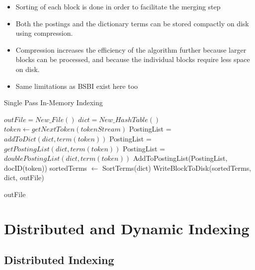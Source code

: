 \documentclass{article}
\begin{document}
\begin{itemize}
    \item Sorting of each block is done in order to facilitate the merging step
    
    \item Both the postings and the dictionary terms can be stored compactly on disk using compression.
    
    \item Compression increases the efficiency of the algorithm further because larger blocks can be processed, and because the individual blocks require less space on disk. 
    
    \item Same limitations as BSBI exist here too
    
\end{itemize}
\begin{algorithm}[!t]
\caption{Single Pass In-Memory Indexing}
\begin{algorithmic}
    \State $outFile = New\_File()$
    \State $dict = New\_HashTable()$
        \State $token \leftarrow getNextToken(tokenStream)$
            \State PostingList = $addToDict(dict, term(token))$
        \Else
            \State PostingList = $getPostingList(dict, term(token))$
        \EndIf
            \State PostingList = $doublePostingList(dict, term(token))$
        \EndIf
        \State AddToPostingList(PostingList, docID(token))
    \EndWhile
    \State sortedTerms $\leftarrow$ SortTerms(dict)
    \State WriteBlockToDisk(sortedTerms, dict, outFile)
    
    \Return outFile
    \EndProcedure
\end{algorithmic}
\end{algorithm}

\section{Distributed and Dynamic Indexing}

\subsection{Distributed Indexing}
\end{document}
